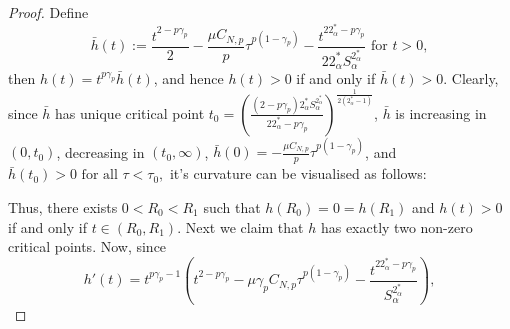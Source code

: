 \documentclass[11pt]{article}
\numberwithin{equation}{section}
\numberwithin{mytheorem}{section}
\begin{document}
		\begin{proof}
			Define $$\bar{h}(t):= \frac{t^{2-p\gamma_p}}{2}-\frac{\mu C_{N,p}}{p}\tau^{p(1-\gamma_p)}-\frac{t^{22^*_{\alpha}-p\gamma_p}}{22^*_{\alpha}S_{\alpha}^{2^*_{\alpha}}} \text{ for } t>0,$$
			then $h(t)=t^{p\gamma_p}\bar{h}(t)$, and hence $h(t)>0$ if and only if $\bar{h}(t)>0$. Clearly, since $\bar{h}$ has unique critical point $t_0=\left( \frac{(2-p\gamma_p)2^*_{\alpha}S_{\alpha}^{2^*_{\alpha}}}{22^*_{\alpha}-p\gamma_p}\right)^{\frac{1}{2(2^*_{\alpha}-1)}}$, $\bar{h}$ is increasing in $(0,t_0)$, decreasing in $(t_0,\infty)$, $\bar{h}(0)=-\frac{\mu C_{N,p}}{p}\tau^{p(1-\gamma_p)}$, and $\bar{h}(t_0)>0 \text{ for all } \tau<\tau_0,$
			it's curvature can be visualised as follows:
			\begin{center}
			\end{center}
			Thus, there exists $0<R_0<R_1$ such that $h(R_0)=0=h(R_1)$ and $h(t)>0$ if and only if $t\in (R_0,R_1)$. 
			Next we claim that $h$ has exactly two non-zero critical points.
			Now, since 
			$$h'(t)=t^{p\gamma_p-1}\left(t^{2-p\gamma_p}-\mu\gamma_pC_{N,p}\tau^{p(1-\gamma_p)}-\frac{t^{22^*_{\alpha}-p\gamma_p}}{S_{\alpha}^{2^*_{\alpha}}}\right),$$

\end{proof}
\end{document}
